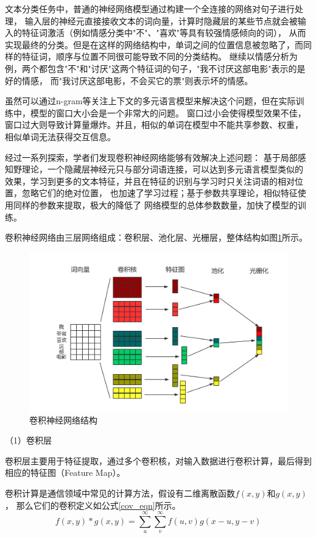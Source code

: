 文本分类任务中，普通的神经网络模型通过构建一个全连接的网络对句子进行处理，
输入层的神经元直接接收文本的词向量，计算时隐藏层的某些节点就会被输入的特征词激活（例如情感分类中"不"、"喜欢"等具有较强情感倾向的词），
从而实现最终的分类。但是在这样的网络结构中，单词之间的位置信息被忽略了，而同样的特征词，顺序与位置不同很可能导致不同的分类结构。
继续以情感分析为例，两个都包含"不"和"讨厌"这两个特征词的句子，"我不讨厌这部电影"表示的是好的情感，
而"我讨厌这部电影，不会买它的票"则表示坏的情感。

虽然可以通过n-gram等关注上下文的多元语言模型来解决这个问题，但在实际训练中，模型的窗口大小会是一个非常大的问题。
窗口过小会使得模型效果不佳，窗口过大则导致计算量爆炸。并且，相似的单词在模型中不能共享参数、权重，
相似单词无法获得交互信息。

经过一系列探索，学者们发现卷积神经网络能够有效解决上述问题：
基于局部感知野理论，一个隐藏层神经元只与部分词语连接，可以达到多元语言模型类似的
效果，学习到更多的文本特征，并且在特征的识别与学习时只关注词语的相对位置，忽略它们的绝对位置，
也加速了学习过程；基于参数共享理论，相似特征使用同样的参数来提取，极大的降低了
网络模型的总体参数数量，加快了模型的训练。

卷积神经网络由三层网络组成：卷积层、池化层、光栅层，整体结构如图\ref{Text_CNN}所示。
\begin{figure}[h]
    \includegraphics[scale=0.4]{picture/Text_CNN.png}
    \caption{卷积神经网络结构}
    \label{Text_CNN}
\end{figure}

（1）卷积层

卷积层主要用于特征提取，通过多个卷积核，对输入数据进行卷积计算，最后得到相应的特征图（Feature Map）。

卷积计算是通信领域中常见的计算方法，假设有二维离散函数$f\left ( x,y \right )$和$g\left ( x,y \right )$，
那么它们的卷积定义如公式\ref{cov_eqn}所示。
\begin{equation}
    f\left ( x,y \right )\ast g\left ( x,y \right )=\sum_{u}^{\infty }\sum_{v}^{\infty }f\left ( u,v \right )
g\left ( x-u,y-v \right )
    \label{cov_eqn}
\end{equation}

